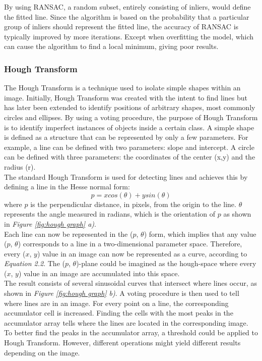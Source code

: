 \noindent By using RANSAC, a random subset, entirely consisting of inliers, would define the fitted line. Since the algorithm is based on the probability that a particular group of inliers should represent the fitted line, the accuracy of RANSAC is typically improved by more iterations. Except when overfitting the model, which can cause the algorithm to find a local minimum, giving poor results.

\subsubsection{Hough Transform}
The Hough Transform \cite{Duda} is a technique used to isolate simple shapes within an image. Initially, Hough Transform was created with the intent to find lines but has later been extended to identify positions of arbitrary shapes, most commonly circles and ellipses. By using a voting procedure, the purpose of Hough Transform is to identify imperfect instances of objects inside a certain class. A simple shape is defined as a structure that can be represented by only a few parameters. For example, a line can be defined with two parameters: slope and intercept. A circle can be defined with three parameters: the coordinates of the center (x,y) and the radius (r).  \\

\noindent The standard Hough Transform is used for detecting lines and achieves this by defining a line in the Hesse normal form: \begin{equation} p = xcos(\theta) + ysin(\theta) \end{equation}  where $p$ is the perpendicular distance, in pixels, from the origin to the line. $\theta$ represents the angle measured in radians, which is the orientation of $p$ as shown in \textit{Figure \ref{fig:hough graph} a)}. \\

\noindent Each line can now be represented in the ($p$, $\theta$) form, which implies that any value ($p$, $\theta$) corresponds to a line in a two-dimensional parameter space. Therefore, every ($x$, $y$) value in an image can now be represented as a curve, according to \textit{Equation 2.2}. The ($p$, $\theta$)-plane could be imagined as the hough-space where every ($x$, $y$) value in an image are accumulated into this space. \\

\noindent The result consists of several sinusoidal curves that intersect where lines occur, as shown in \textit{Figure \ref{fig:hough graph}  b)}. A voting procedure is then used to tell where lines are in an image. For every point on a line, the corresponding accumulator cell is increased. Finding the cells with the most peaks in the accumulator array tells where the lines are located in the corresponding image. To better find the peaks in the accumulator array, a threshold could be applied to Hough Transform. However, different operations might yield different results depending on the image. 


